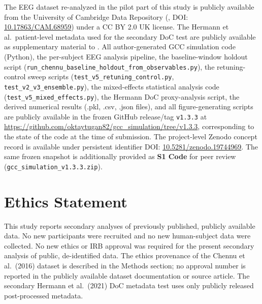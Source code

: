﻿\documentclass[11pt,a4paper]{article}
\theoremstyle{plain}
\theoremstyle{definition}
\theoremstyle{remark}
\begin{document}
\begin{sloppypar}
The EEG dataset re-analyzed in the pilot part of this study is publicly available from the University of Cambridge Data Repository (\citealp{chennu2016}, DOI: \href{https://doi.org/10.17863/CAM.68959}{10.17863/CAM.68959}) under a CC BY 2.0 UK license. The Hermann et al.\ patient-level metadata used for the secondary DoC test are publicly available as supplementary material to \citet{hermann2021}. All author-generated GCC simulation code (Python), the per-subject EEG analysis pipeline, the baseline-window holdout script (\texttt{run\_chennu\_baseline\_holdout\_from\_observables.py}), the retuning-control sweep scripts (\texttt{test\_v5\_retuning\_control.py}, \texttt{test\_v2\_v3\_ensemble.py}), the mixed-effects statistical analysis code (\texttt{test\_v5\_mixed\_effects.py}), the Hermann DoC proxy-analysis script, the derived numerical results (.pkl, .csv, .json files), and all figure-generating scripts are publicly available in the frozen GitHub release/tag \texttt{v1.3.3} at \url{https://github.com/oktaytugan82/gcc_simulation/tree/v1.3.3}, corresponding to the state of the code at the time of submission. The project-level Zenodo concept record is available under persistent identifier DOI: \href{https://doi.org/10.5281/zenodo.19744969}{10.5281/zenodo.19744969}. The same frozen snapshot is additionally provided as \textbf{S1 Code} for peer review (\texttt{gcc\_simulation\_v1.3.3.zip}).
\end{sloppypar}

\section*{Ethics Statement}

This study reports secondary analyses of previously published, publicly available data. No new participants were recruited and no new human-subject data were collected. No new ethics or IRB approval was required for the present secondary analysis of public, de-identified data. The ethics provenance of the Chennu et al.\ (2016) dataset is described in the Methods section; no approval number is reported in the publicly available dataset documentation or source article. The secondary Hermann et al.\ (2021) DoC metadata test uses only publicly released post-processed metadata.

\end{document}
